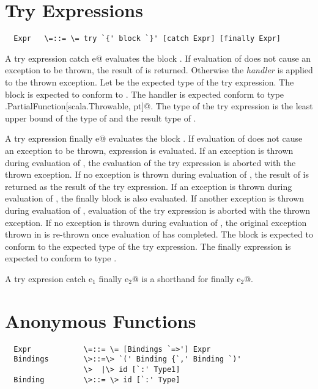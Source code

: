 \documentclass[11pt]{report}
\begin{document}
\section{Try Expressions}

\syntax\begin{verbatim}
  Expr   \=::= \= try `{' block `}' [catch Expr] [finally Expr]
\end{verbatim}

A try expression  catch e@ evaluates the block
\verb@b@.  If evaluation of \verb@b@ does not cause an exception to be
thrown, the result of \verb@b@ is returned. Otherwise the {\em
handler} \verb@e@ is applied to the thrown exception.  Let \verb@pt@
be the expected type of the try expression.  The block \verb@b@ is
expected to conform to \verb@pt@.  The handler \verb@e@ is expected
conform to type \verb@scala.PartialFunction[scala.Throwable, pt]@.
The type of the try expression is the least upper bound of the type of
\verb@b@ and the result type of \verb@e@.

A try expression  finally e@ evaluates the block
\verb@b@.  If evaluation of \verb@b@ does not cause an exception to be
thrown, expression \verb@e@ is evaluated. If an exception is thrown
during evaluation of \verb@e@, the evaluation of the try expression is
aborted with the thrown exception. If no exception is thrown during
evaluation of \verb@e@, the result of \verb@b@ is returned as the
result of the try expression. If an exception is thrown during
evaluation of \verb@b@, the finally block
\verb@e@ is also evaluated. If another exception \verb@e@ is thrown
during evaluation of \verb@e@, evaluation of the try expression is
aborted with the thrown exception. If no exception is thrown during
evaluation of \verb@e@, the original exception thrown in \verb@b@ is
re-thrown once evaluation of \verb@e@ has completed.  The block
\verb@b@ is expected to conform to the expected type of the try
expression. The finally expression \verb@e@ is expected to conform to
type \verb@unit@.

A try expresion  catch e$_1$ finally e$_2$@ is a shorthand
for   finally e$_2$@.

\section{Anonymous Functions}
\label{sec:closures}

\syntax\begin{verbatim}
  Expr            \=::= \= [Bindings `=>'] Expr
  Bindings        \>::=\> `(' Binding {`,' Binding `)'
                  \>  |\> id [`:' Type1]
  Binding         \>::= \> id [`:' Type]
\end{verbatim}
\end{document}

